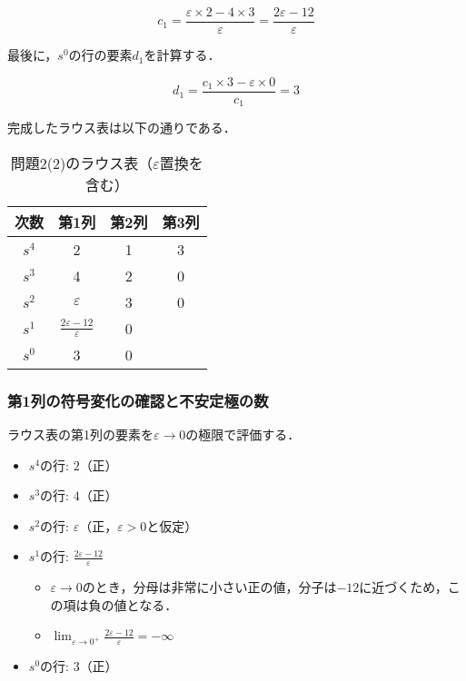 \documentclass[11pt,a4paper]{ltjsarticle}
\begin{document}
\begin{equation}
c_1 = \frac{\varepsilon \times 2 - 4 \times 3}{\varepsilon} = \frac{2\varepsilon - 12}{\varepsilon}
\end{equation}

最後に，$s^0$の行の要素$d_1$を計算する．

\begin{equation}
d_1 = \frac{c_1 \times 3 - \varepsilon \times 0}{c_1} = 3
\end{equation}

完成したラウス表は以下の通りである．

\begin{table}[h]
\centering
\caption{\texorpdfstring{問題2(2)のラウス表（$\varepsilon$置換を含む）}{問題2(2)のラウス表（イプシロン置換を含む）}}
\label{tbl:routh2}
\begin{tabular}{cccc}
\toprule
次数 & 第1列 & 第2列 & 第3列 \\
\midrule
$s^4$ & 2 & 1 & 3 \\
$s^3$ & 4 & 2 & 0 \\
$s^2$ & $\varepsilon$ & 3 & 0 \\
$s^1$ & $\frac{2\varepsilon-12}{\varepsilon}$ & 0 & \\
$s^0$ & 3 & 0 & \\
\bottomrule
\end{tabular}
\end{table}

\subsubsection{第1列の符号変化の確認と不安定極の数}

ラウス表の第1列の要素を$\varepsilon \to 0$の極限で評価する．

\begin{itemize}
\item $s^4$の行: $2$（正）
\item $s^3$の行: $4$（正）
\item $s^2$の行: $\varepsilon$（正，$\varepsilon > 0$と仮定）
\item $s^1$の行: $\frac{2\varepsilon-12}{\varepsilon}$
  \begin{itemize}
  \item $\varepsilon \to 0$のとき，分母は非常に小さい正の値，分子は$-12$に近づくため，この項は負の値となる．
  \item $\lim_{\varepsilon \to 0^+} \frac{2\varepsilon-12}{\varepsilon} = -\infty$
  \end{itemize}
\item $s^0$の行: $3$（正）
\end{itemize}
\end{document}
